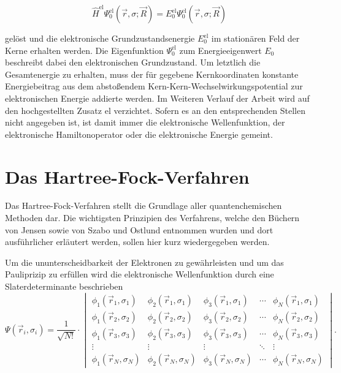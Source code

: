 \begin{equation}
  \hat{H}^{\text{el}}\Psi^{\text{el}}_0(\vec{r},\sigma;\vec{R})=E^{\text{el}}_0\Psi^{\text{el}}_0(\vec{r},\sigma;\vec{R})
\end{equation}

gelöst und die elektronische Grundzustandsenergie $E^{\text{el}}_0$ im stationären Feld der Kerne erhalten werden. Die Eigenfunktion $\Psi^{\text{el}}_0$ zum Energieeigenwert $E_0$ beschreibt dabei den elektronischen Grundzustand. Um letztlich die Gesamtenergie zu erhalten, muss der für gegebene Kernkoordinaten konstante Energiebeitrag aus dem abstoßendem Kern-Kern-Wechselwirkungspotential zur elektronischen Energie addierte werden. Im Weiteren Verlauf der Arbeit wird auf den hochgestellten Zusatz \glqq el\grqq{} verzichtet. Sofern es an den entsprechenden Stellen nicht angegeben ist, ist damit immer die elektronische Wellenfunktion, der elektronische Hamiltonoperator oder die elektronische Energie gemeint.


\section{Das Hartree-Fock-Verfahren}

Das Hartree-Fock-Verfahren stellt die Grundlage aller quantenchemischen Methoden dar. Die wichtigsten Prinzipien des Verfahrens, welche den Büchern von Jensen\supercite{jensen2009introduction} sowie von Szabo und Ostlund\supercite{szabo1982modern} entnommen wurden und dort ausführlicher erläutert werden, sollen hier kurz wiedergegeben werden. 

Um die ununterscheidbarkeit der Elektronen zu gewährleisten und um das Pauliprizip zu erfüllen wird die elektronische Wellenfunktion durch eine Slaterdeterminante\supercite{slater1974self} beschrieben
\begin{equation}
\Psi(\vec{r}_i,\sigma_i)=\frac{1}{\sqrt{N!}}\cdot\begin{vmatrix}
\phi_1(\vec{r}_1,\sigma_1) & \phi_2(\vec{r}_1,\sigma_1) & \phi_3(\vec{r}_1,\sigma_1) &\cdots & \phi_N(\vec{r}_1,\sigma_1) \\
\phi_1(\vec{r}_2,\sigma_2) & \phi_2(\vec{r}_2,\sigma_2) & \phi_3(\vec{r}_2,\sigma_2) &\cdots & \phi_N(\vec{r}_2,\sigma_2) \\
\phi_1(\vec{r}_3,\sigma_3) & \phi_2(\vec{r}_3,\sigma_3) & \phi_3(\vec{r}_3,\sigma_3) &\cdots & \phi_N(\vec{r}_3,\sigma_3) \\
\vdots & \vdots & \vdots & \ddots & \vdots\\
\phi_1(\vec{r}_N,\sigma_N) & \phi_2(\vec{r}_N,\sigma_N) & \phi_3(\vec{r}_N,\sigma_N) &\cdots & \phi_N(\vec{r}_N,\sigma_N)
\end{vmatrix}.
\end{equation}

